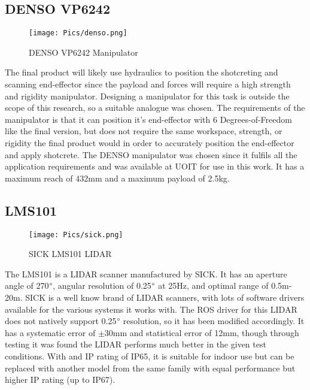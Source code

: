 \subsection{DENSO VP6242}
\begin{figure}[H]
    \centering
    \texttt{[image: Pics/denso.png]}
    \caption{DENSO VP6242 Manipulator \cite{densopage}}
    \label{fig:sick}
\end{figure}
The final product will likely use hydraulics to position the shotcreting and scanning end-effector since the payload and forces will require a high strength and rigidity manipulator. Designing a manipulator for this task is outside the scope of this research, so a suitable analogue was chosen. The requirements of the manipulator is that it can position it's end-effector with 6 Degrees-of-Freedom like the final version, but does not require the same workspace, strength, or rigidity the final product would in order to accurately position the end-effector and apply shotcrete. The DENSO manipulator was chosen since it fulfils all the application requirements and was available at UOIT for use in this work. It has a maximum reach of 432mm and a maximum payload of 2.5kg.\\ 
\subsection{LMS101}

\begin{figure}[H]
    \centering
    \texttt{[image: Pics/sick.png]}
    \caption{SICK LMS101 LIDAR \cite{sickpage}}
    \label{fig:sick}
\end{figure}
The LMS101 is a LIDAR scanner manufactured by SICK. It has an aperture angle of 270$\degree$, angular resolution of 0.25$\degree$ at 25Hz, and optimal range of 0.5m-20m. SICK is a well know brand of LIDAR scanners, with lots of software drivers available for the various systems it works with. The ROS driver for this LIDAR does not natively support 0.25$\degree$ resolution, so it has been modified accordingly. It has a systematic error of $\pm$30mm and statistical error	of 12mm, though through testing it was found the LIDAR performs much better in the given test conditions. With and IP rating of IP65, it is suitable for indoor use but can be replaced with another model from the same family with equal performance but higher IP rating (up to IP67).\\
